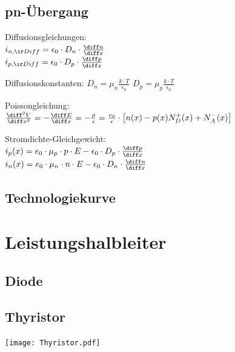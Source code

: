 \documentclass[german]{latex4ei_fs}
\begin{document}
\begin{sectionbox}

\subsection{pn-Übergang}

Diffusionsgleichungen: \\
$i_{n, \ir Diff} = \epsilon_0 \cdot D_n \cdot \frac{\diff n}{\diff x}$\\
$i_{p, \ir Diff} = \epsilon_0 \cdot D_p \cdot \frac{\diff p}{\diff x}$

Diffusionskonstanten: 
$D_n = \mu_n \frac{k \cdot T}{\epsilon_0}$ \quad $D_p = \mu_p \frac{k \cdot T}{\epsilon_0}$

Poissongleichung: \\
 $\frac{\diff^2 V}{\diff x^2} = - \frac{\diff E}{\diff x} = - \frac{\rho}{\epsilon} = \frac{e_0}{\epsilon} \cdot \left[ n(x) - p(x)  N_D^+ (x) + N_A^- (x) \right]$

 Stromdichte-Gleichgewicht: \\
 $i_p (x) = e_0 \cdot \mu_p \cdot p \cdot E - \epsilon_0 \cdot D_p \cdot \frac{\diff p}{\diff x}$ \\
  $i_n (x) = e_0 \cdot \mu_n \cdot n \cdot E - \epsilon_0 \cdot D_n \cdot \frac{\diff n}{\diff x}$
\end{sectionbox}

\begin{sectionbox}
\subsection{Technologiekurve}
\end{sectionbox}

\section{Leistungshalbleiter}

\begin{sectionbox}
\subsection{Diode}
\end{sectionbox}

\begin{sectionbox}
\subsection{Thyristor}
\texttt{[image: Thyristor.pdf]}

\end{sectionbox}
\end{document}
